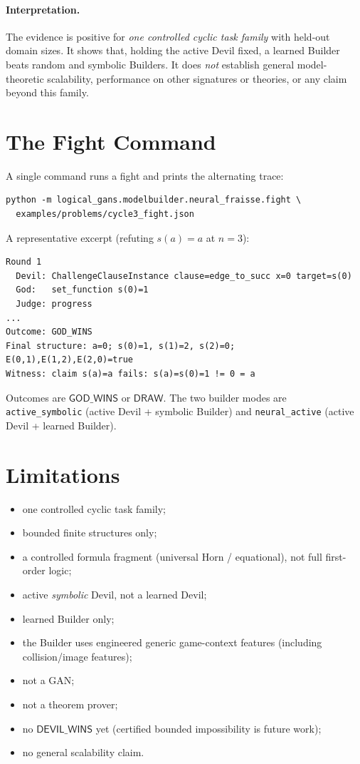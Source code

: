 \documentclass[11pt]{article}
\begin{document}
\paragraph{Interpretation.}
The evidence is positive for \emph{one controlled cyclic task family} with held-out domain sizes.  It shows that, holding the active Devil fixed, a learned Builder beats random and symbolic Builders.  It does \emph{not} establish general model-theoretic scalability, performance on other signatures or theories, or any claim beyond this family.

\section{The Fight Command}\label{sec:fight}

A single command runs a fight and prints the alternating trace:
\begin{lstlisting}[basicstyle=\ttfamily\small]
python -m logical_gans.modelbuilder.neural_fraisse.fight \
  examples/problems/cycle3_fight.json
\end{lstlisting}

A representative excerpt (refuting \(s(a)=a\) at \(n=3\)):
\begin{lstlisting}[basicstyle=\ttfamily\small]
Round 1
  Devil: ChallengeClauseInstance clause=edge_to_succ x=0 target=s(0)
  God:   set_function s(0)=1
  Judge: progress
...
Outcome: GOD_WINS
Final structure: a=0; s(0)=1, s(1)=2, s(2)=0; E(0,1),E(1,2),E(2,0)=true
Witness: claim s(a)=a fails: s(a)=s(0)=1 != 0 = a
\end{lstlisting}

Outcomes are \(\mathsf{GOD\_WINS}\) or \(\mathsf{DRAW}\).  The two builder modes are \texttt{active\_symbolic} (active Devil + symbolic Builder) and \texttt{neural\_active} (active Devil + learned Builder).

\section{Limitations}\label{sec:nf-limits}

\begin{itemize}[leftmargin=2em]
  \item one controlled cyclic task family;
  \item bounded finite structures only;
  \item a controlled formula fragment (universal Horn / equational), not full first-order logic;
  \item active \emph{symbolic} Devil, not a learned Devil;
  \item learned Builder only;
  \item the Builder uses engineered generic game-context features (including collision/image features);
  \item not a GAN;
  \item not a theorem prover;
  \item no \(\mathsf{DEVIL\_WINS}\) yet (certified bounded impossibility is future work);
  \item no general scalability claim.
\end{itemize}
\end{document}
